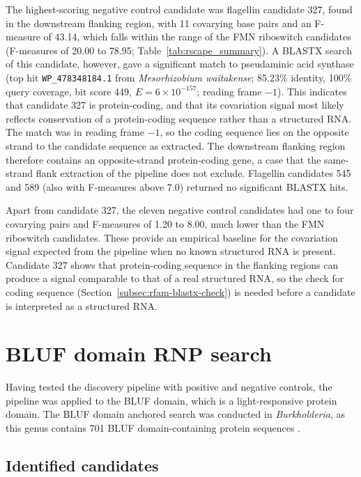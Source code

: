 The highest-scoring negative control candidate was flagellin candidate 327, found in the downstream flanking region, with 11 covarying base pairs and an F-measure of 43.14, which falls within the range of the \ac{FMN} riboswitch candidates (F-measures of 20.00 to 78.95; Table~\ref{tab:rscape_summary}).
A BLASTX search of this candidate, however, gave a significant match to pseudaminic acid synthase (top hit \texttt{WP\_478348184.1} from \emph{Mesorhizobium waitakense}; 85.23\% identity, 100\% query coverage, bit score 449, $E = 6 \times 10^{-157}$; reading frame $-1$).
This indicates that candidate 327 is protein-coding, and that its covariation signal most likely reflects conservation of a protein-coding sequence rather than a structured RNA.
The match was in reading frame $-1$, so the coding sequence lies on the opposite strand to the candidate sequence as extracted.
The downstream flanking region therefore contains an opposite-strand protein-coding gene, a case that the same-strand flank extraction of the pipeline does not exclude.
Flagellin candidates 545 and 589 (also with F-measures above 7.0) returned no significant BLASTX hits.

Apart from candidate 327, the eleven negative control candidates had one to four covarying pairs and F-measures of 1.20 to 8.00, much lower than the \ac{FMN} riboswitch candidates.
These provide an empirical baseline for the covariation signal expected from the pipeline when no known structured RNA is present.
Candidate 327 shows that protein-coding sequence in the flanking regions can produce a signal comparable to that of a real structured RNA, so the check for coding sequence (Section~\ref{subsec:rfam-blastx-check}) is needed before a candidate is interpreted as a structured RNA.

\section{\ac{BLUF} domain \ac{RNP} search}

Having tested the discovery pipeline with positive and negative controls, the pipeline was applied to the \ac{BLUF} domain, which is a light-responsive protein domain.
The \ac{BLUF} domain anchored search was conducted in \emph{Burkholderia}, as this genus contains 701 \ac{BLUF} domain-containing protein sequences \citep{Blum2025}.

\subsection{Identified candidates}

